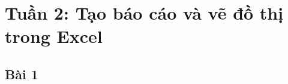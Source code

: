 \documentclass{article}
\begin{document}
\tableofcontents
\newpage
\listoffigures
\newpage
\section{Tuần 2:  Tạo báo cáo và vẽ đồ thị trong Excel}  
\subsection{Bài 1}  
































\end{document}

